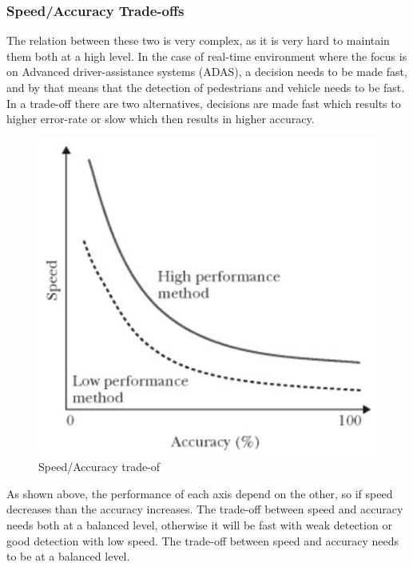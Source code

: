         \subsubsection{Speed/Accuracy Trade-offs}
            The relation between these two is very complex, as it is very hard to maintain them both
            at a high level. In the case of real-time environment where the focus is on Advanced
            driver-assistance systems (ADAS), a decision needs to be made fast, and by that means
            that the detection of pedestrians and vehicle needs to be fast. In a trade-off there are two
            alternatives, decisions are made fast which results to higher error-rate or slow which then
            results in higher accuracy.
            \begin{figure}[H]
                \centering
                \includegraphics[width=0.6\linewidth]{img/trade-off.png}
                \caption{Speed/Accuracy trade-of}
            \end{figure}
            As shown above, the performance of each axis depend on the other, so if speed
            decreases than the accuracy increases. The trade-off between speed and accuracy needs
            both at a balanced level, otherwise it will be fast with weak detection or good detection
            with low speed. The trade-off between speed and accuracy needs to be at a balanced
            level.

